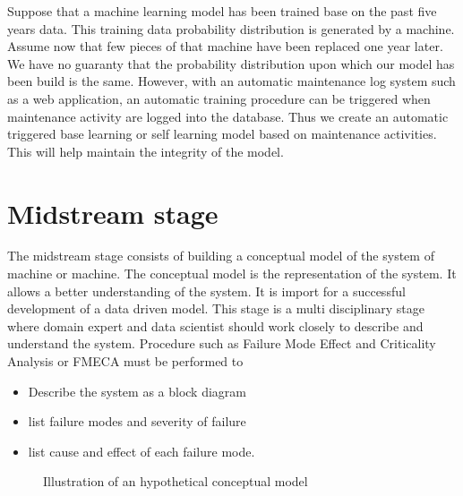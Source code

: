 \documentclass[11pt, oneside]{article}   	%
\begin{document}
\justify
Suppose that a machine learning model has been trained base on the past five years data. This training data probability distribution is generated by a machine. Assume now that few pieces of that machine have been replaced one year later. We have no guaranty that the probability distribution upon which our model has been build is the same. However, with an automatic maintenance log system such as a web application, an automatic training procedure can be triggered when maintenance activity are logged into the database. Thus we create an automatic triggered base learning or self learning model based on maintenance activities. This will help maintain the integrity of the model.

\section{Midstream stage}
The midstream stage consists of building a conceptual model of the system of machine or machine. The conceptual model is the representation of the system. It allows a better understanding of the system. It is import for a successful development of a data driven model. This stage is a multi disciplinary stage where domain expert and data scientist should work closely to describe and understand the system. Procedure such as Failure Mode Effect and Criticality Analysis or FMECA must be performed to 
\begin{itemize}
\item Describe the system as a block diagram
\item list failure modes and severity of failure
\item list cause and effect of each failure mode.
\end{itemize} 
\justify
\begin{figure}[H]
\begin{center}
\caption{Illustration of an hypothetical conceptual model}
\label{fig:conceptual}
\end{center}
\end{figure}
\end{document}

